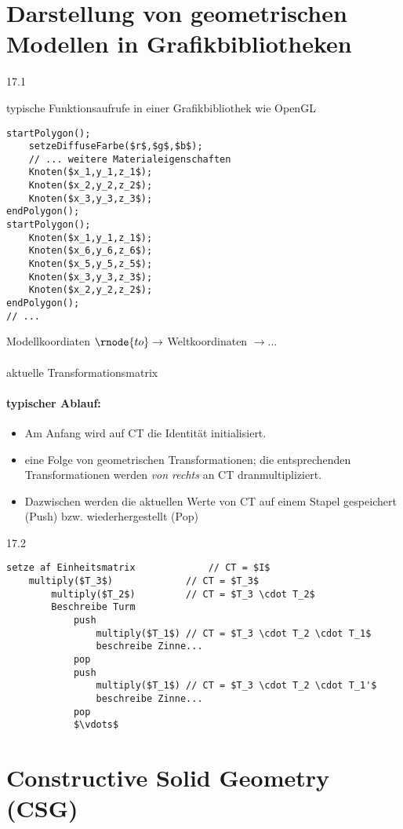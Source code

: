\section{Darstellung von geometrischen Modellen in Grafikbibliotheken}
\begin{center}
 17.1
\end{center}
typische Funktionsaufrufe in einer Grafikbibliothek wie OpenGL
\begin{lstlisting}
startPolygon();
	setzeDiffuseFarbe($r$,$g$,$b$);
	// ... weitere Materialeigenschaften
	Knoten($x_1,y_1,z_1$);
	Knoten($x_2,y_2,z_2$);
	Knoten($x_3,y_3,z_3$);
endPolygon();
startPolygon();
	Knoten($x_1,y_1,z_1$);
	Knoten($x_6,y_6,z_6$);
	Knoten($x_5,y_5,z_5$);
	Knoten($x_3,y_3,z_3$);
	Knoten($x_2,y_2,z_2$);
endPolygon();
// ...
\end{lstlisting}
\begin{center}
Modellkoordiaten $\rnode{to}\rightarrow$ Weltkoordinaten {\color{gray}$\rightarrow ...$}\\[2em]
\\
aktuelle Transformationsmatrix
\end{center}
\paragraph*{typischer Ablauf: }
\begin{itemize}
\item Am Anfang wird auf CT die Identität initialisiert.
\item eine Folge von geometrischen Transformationen; die entsprechenden Transformationen werden \emph{von rechts}
	an CT dranmultipliziert.
\item Dazwischen werden die aktuellen Werte von CT auf einem Stapel gespeichert (Push) bzw. wiederhergestellt (Pop)
\end{itemize}
\begin{center}
 17.2
\end{center}
\begin{lstlisting}
setze af Einheitsmatrix				// CT = $I$
	multiply($T_3$)				// CT = $T_3$
		multiply($T_2$)			// CT = $T_3 \cdot T_2$
		Beschreibe Turm
			push
				multiply($T_1$)	// CT = $T_3 \cdot T_2 \cdot T_1$
				beschreibe Zinne...
			pop
			push
				multiply($T_1$)	// CT = $T_3 \cdot T_2 \cdot T_1'$
				beschreibe Zinne...
			pop
			$\vdots$
\end{lstlisting}

\section{Constructive Solid Geometry (CSG)}
